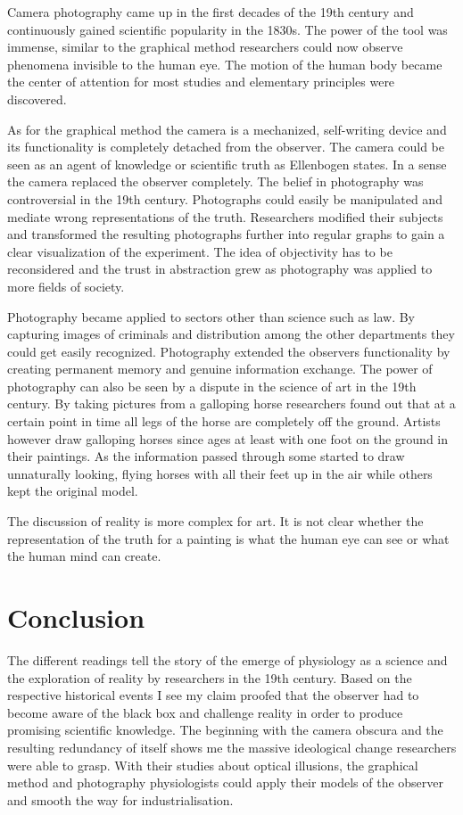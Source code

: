 \documentclass[12pt,a4paper]{article}
\begin{document}
Camera photography came up in the first decades of the 19th century and continuously gained scientific
popularity in the 1830s. The power of the tool was immense, similar to the graphical method researchers 
could now observe phenomena invisible to the human eye. The motion of the human body became the
center of attention for most studies and elementary principles were discovered.

As for the graphical method the camera is a mechanized, self-writing device and its functionality is
completely detached from the observer. The camera could be seen as an agent of knowledge or scientific
truth as Ellenbogen states. In a sense the camera replaced the observer completely.
The belief in photography was controversial in the 19th century.
Photographs could easily be manipulated and mediate wrong representations of the truth.
Researchers modified their subjects and transformed the resulting photographs further into regular
graphs to gain a clear visualization of the experiment. The idea of objectivity has to be
reconsidered and the trust in abstraction grew as photography was applied to more fields of society.

Photography became applied to sectors other than science such as law. By capturing images of criminals
and distribution among the other departments they could get easily recognized.
Photography extended the observers functionality by creating permanent memory and genuine information
exchange. The power of photography can also be seen by a dispute in the science of art in the 19th
century. By taking pictures from a galloping horse researchers found out that at a certain point in time all legs
of the horse are completely off the ground. Artists however draw galloping horses since ages at least with
one foot on the ground in their paintings. As the information passed through some started to draw unnaturally looking, flying horses with all their feet up in the air while others kept the original model.

The discussion of reality is more complex for art. It is not clear whether the representation of the truth
for a painting is what the human eye can see or what the human mind can create.

\section*{Conclusion}

The different readings tell the story of the emerge of physiology as a science and the exploration of reality
by researchers in the 19th century. Based on the respective historical events I see my claim
proofed that the observer had to become aware of the black box and challenge reality in order to
produce promising scientific knowledge. The beginning with the camera obscura and the
resulting redundancy of itself shows me the massive ideological change researchers were able to grasp.
With their studies about optical illusions, the graphical method and photography physiologists could apply
their models of the observer and smooth the way for industrialisation.

\newpage



\end{document}
